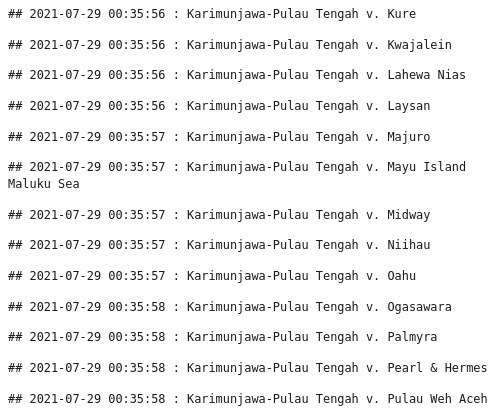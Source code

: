 \documentclass[
]{article}
\begin{document}
\begin{verbatim}
## 2021-07-29 00:35:56 : Karimunjawa-Pulau Tengah v. Kure
\end{verbatim}

\begin{verbatim}
## 2021-07-29 00:35:56 : Karimunjawa-Pulau Tengah v. Kwajalein
\end{verbatim}

\begin{verbatim}
## 2021-07-29 00:35:56 : Karimunjawa-Pulau Tengah v. Lahewa Nias
\end{verbatim}

\begin{verbatim}
## 2021-07-29 00:35:56 : Karimunjawa-Pulau Tengah v. Laysan
\end{verbatim}

\begin{verbatim}
## 2021-07-29 00:35:57 : Karimunjawa-Pulau Tengah v. Majuro
\end{verbatim}

\begin{verbatim}
## 2021-07-29 00:35:57 : Karimunjawa-Pulau Tengah v. Mayu Island Maluku Sea
\end{verbatim}

\begin{verbatim}
## 2021-07-29 00:35:57 : Karimunjawa-Pulau Tengah v. Midway
\end{verbatim}

\begin{verbatim}
## 2021-07-29 00:35:57 : Karimunjawa-Pulau Tengah v. Niihau
\end{verbatim}

\begin{verbatim}
## 2021-07-29 00:35:57 : Karimunjawa-Pulau Tengah v. Oahu
\end{verbatim}

\begin{verbatim}
## 2021-07-29 00:35:58 : Karimunjawa-Pulau Tengah v. Ogasawara
\end{verbatim}

\begin{verbatim}
## 2021-07-29 00:35:58 : Karimunjawa-Pulau Tengah v. Palmyra
\end{verbatim}

\begin{verbatim}
## 2021-07-29 00:35:58 : Karimunjawa-Pulau Tengah v. Pearl & Hermes
\end{verbatim}

\begin{verbatim}
## 2021-07-29 00:35:58 : Karimunjawa-Pulau Tengah v. Pulau Weh Aceh
\end{verbatim}
\end{document}

